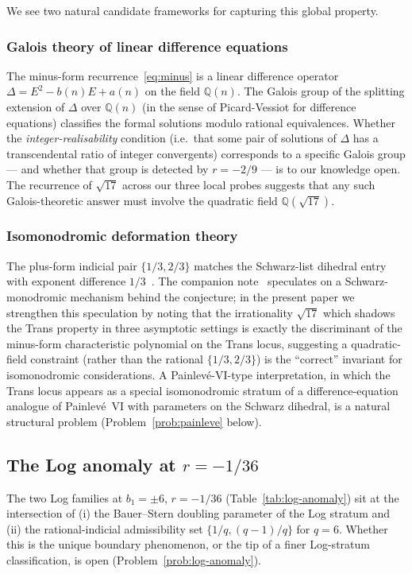\documentclass[11pt]{amsart}
\theoremstyle{definition}
\theoremstyle{remark}
\newcommand{\Q}{\mathbb{Q}}
\begin{document}
We see two natural candidate frameworks for capturing this global
property.

\subsubsection{Galois theory of linear difference equations}
The minus-form recurrence~\eqref{eq:minus} is a linear difference
operator $\Delta = E^2 - b(n) E + a(n)$ on the field $\Q(n)$.  The
Galois group of the splitting extension of $\Delta$ over $\Q(n)$
(in the sense of Picard-Vessiot for difference equations) classifies
the formal solutions modulo rational equivalences.  Whether the
\emph{integer-realisability} condition (i.e.\ that some pair of
solutions of $\Delta$ has a transcendental ratio of integer
convergents) corresponds to a specific Galois group --- and whether
that group is detected by $r=-2/9$ --- is to our knowledge open.
The recurrence of $\sqrt{17}$ across our three local probes
suggests that any such Galois-theoretic answer must involve the
quadratic field $\Q(\sqrt{17})$.

\subsubsection{Isomonodromic deformation theory}
The plus-form indicial pair $\{1/3,2/3\}$ matches the Schwarz-list
dihedral entry with exponent difference $1/3$~\cite{Schwarz}.  The
companion note~\cite{TRINote} speculates on a Schwarz-monodromic
mechanism behind the conjecture; in the present paper we strengthen
this speculation by noting that the irrationality $\sqrt{17}$ which
shadows the Trans property in three asymptotic settings is exactly
the discriminant of the minus-form characteristic polynomial on the
Trans locus, suggesting a quadratic-field constraint (rather than
the rational $\{1/3,2/3\}$) is the ``correct'' invariant for
isomonodromic considerations.  A Painlevé-VI-type interpretation,
in which the Trans locus appears as a special isomonodromic stratum
of a difference-equation analogue of Painlevé~VI with parameters on
the Schwarz dihedral, is a natural structural problem
(Problem~\ref{prob:painleve} below).

\subsection{The Log anomaly at $r=-1/36$}

The two Log families at $b_1=\pm 6$, $r=-1/36$ (Table~\ref{tab:log-anomaly})
sit at the intersection of (i) the Bauer--Stern doubling parameter
of the Log stratum and (ii) the rational-indicial admissibility set
$\{1/q,(q-1)/q\}$ for $q=6$.  Whether this is the unique boundary
phenomenon, or the tip of a finer Log-stratum classification, is
open (Problem~\ref{prob:log-anomaly}).
\end{document}
